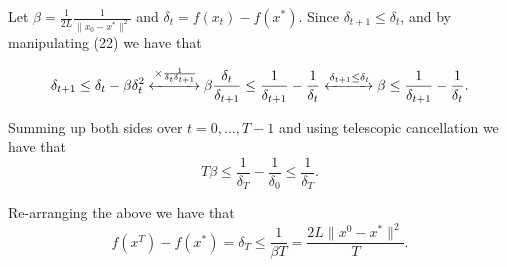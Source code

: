 \documentclass{article}
\begin{document}
Let \( \beta = \frac{1}{2L} \frac{1}{\|x_0 - x^*\|^2} \)  \quad  and \( \delta_t = f(x_t) - f(x^*) \). Since \( \delta_{t+1} \leq \delta_t \), and by manipulating (22) we have that

\[
\delta_{t+1} \leq \delta_t - \beta \delta_t^2 \xleftrightarrow{\times \frac{1}{\delta_t \delta_{t+1}}}
\beta \frac{\delta_t}{\delta_{t+1}} \leq \frac{1}{\delta_{t+1}} - \frac{1}{\delta_t}
\xleftrightarrow{\delta_{t+1} \leq \delta_t}
\beta \leq \frac{1}{\delta_{t+1}} - \frac{1}{\delta_t}.
\]

Summing up both sides over $t = 0, \dots, T - 1$ and using telescopic cancellation we have that
\[
T \beta \leq \frac{1}{\delta_T} - \frac{1}{\delta_0} \leq \frac{1}{\delta_T}.
\]

Re-arranging the above we have that
\[
f(x^T) - f(x^*) = \delta_T \leq \frac{1}{\beta T} = \frac{2L \|x^0 - x^*\|^2}{T}.
\]






\end{document}
